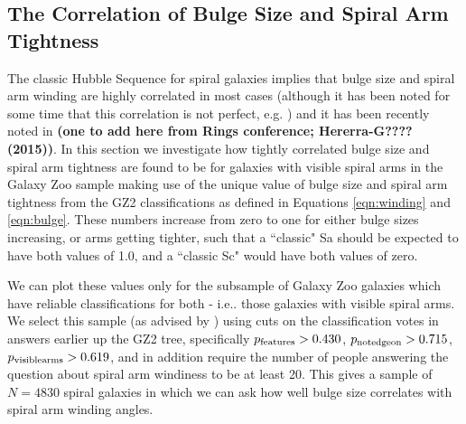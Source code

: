 \documentclass[usenatbib]{mn2e}
\begin{document}

\subsection{The Correlation of Bulge Size and Spiral Arm Tightness}

The classic Hubble Sequence for spiral galaxies implies that bulge size and spiral arm winding are highly correlated in most cases (although it has been noted for some time that this correlation is not perfect, e.g. \citealt{1970ApJ...160..811F, kennicutt1981}) and it has been recently noted in \citet{Davis2015,Hart2017b,Hart2018} {\bf (one to add here from Rings conference; Hererra-G???? (2015))}. In this section we investigate how tightly correlated bulge size and spiral arm tightness are found to be for galaxies with visible spiral arms in the Galaxy Zoo sample making use of the unique value of bulge size and spiral arm tightness from the GZ2 classifications as defined in Equations \ref{eqn:winding} and \ref{eqn:bulge}. These numbers increase from zero to one for either bulge sizes increasing, or arms getting tighter, such that a ``classic" Sa should be expected to have both values of 1.0, and a ``classic Sc" would have both values of zero.  

We can plot these values only for the subsample of Galaxy Zoo galaxies which have reliable classifications for both - i.e.. those galaxies with visible spiral arms. We select this sample (as advised by \citealt{Willett2013}) using cuts on the classification votes in answers earlier up the GZ2 tree, specifically $p_{\rm features} > 0.430$, $p_{\rm notedgeon} > 0.715$, $p_{\rm visiblearms} > 0.619$, and in addition require the number of people answering the question about spiral arm windiness to be at least 20. This gives a sample of $N = 4830$ spiral galaxies in which we can ask how well bulge size correlates with spiral arm winding angles.
 
\end{document}
